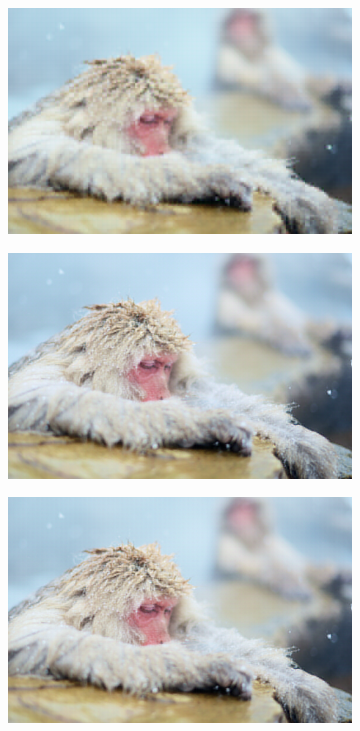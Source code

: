 \documentclass{article}
\begin{document}
\begin{figure}
\begin{subfigure}[b]{0.49 \textwidth}
    \end{subfigure}
    \begin{subfigure}[b]{0.49 \textwidth}
    \includegraphics[width=\textwidth]{Images/autoencoder/reconstructed/500/test2_10.png}
    \end{subfigure}
    \begin{subfigure}[b]{0.49 \textwidth}
    \includegraphics[width=\textwidth]{Images/autoencoder/reconstructed/500/test2_80.png}
    \end{subfigure}
    \begin{subfigure}[b]{0.49 \textwidth}
    \includegraphics[width=\textwidth]{Images/autoencoder/reconstructed/500/test2_90.png}

\end{subfigure}
\end{figure}
\end{document}
